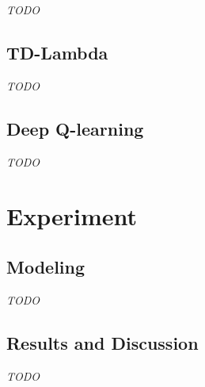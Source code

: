 \documentclass[11pt,twoside]{article}
\begin{document}
\textit{TODO}

\subsection{TD-Lambda}

\textit{TODO}

\subsection{Deep Q-learning}

\textit{TODO}

\section{Experiment}
\label{sec:exper}

\subsection{Modeling}

\textit{TODO}

\subsection{Results and Discussion}

\textit{TODO}



\end{document}
